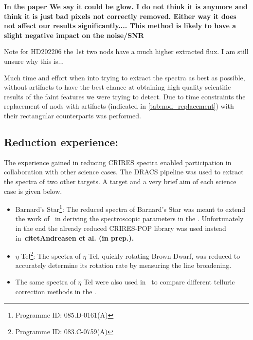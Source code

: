 

\textbf{In the paper We say it could be glow. I do not think it is anymore and think it is just bad pixels not correctly removed. Either way it does not affect our results significantly....
This method is likely to have a slight negative impact on the noise/SNR}

Note for HD202206 the 1st two nods have a much higher extracted flux. I am still unsure why this is...


Much time and effort when into trying to extract the spectra as best as possible, without artifacts to have the best chance at obtaining high quality scientific results of the faint features we were trying to detect.
Due to time constraints the replacement of nods with artifacts (indicated in \ref{tab:nod_replacement}) with their rectangular counterparts was performed.  

\subsection{Reduction experience:}
\label{subsec:experience}
The experience gained in reducing CRIRES spectra enabled participation in collaboration with other science cases. The DRACS pipeline was used to extract the spectra of two other targets. A target and a very brief aim of each science case is given below.
\begin{itemize}
\item Barnard's Star\footnote{Programme ID: 085.D-0161(A)}: The reduced {\nir} spectra of Barnard's Star was meant to extend the work of~\citet{andreasen_nearinfrared_2016} in deriving the spectroscopic parameters in the \nir. Unfortunately in the end the already reduced CRIRES-POP library was used instead in~\bf{citet{Andreasen et al. (in prep.)}}. 
\item $\eta$ Tel\footnote{Programme ID: 083.C-0759(A)}: The spectra of {$\eta$ Tel}, quickly rotating Brown Dwarf, was reduced to accurately determine its rotation rate by measuring the line broadening. 
\item The same spectra of $\eta$ Tel were also used in~\citet{ulmer-moll_telluric_2018} to compare different telluric correction methods in the \nir.
\end{itemize}

